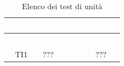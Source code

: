 {
\renewcommand{\arraystretch}{1.5}
\centering
\begin{longtable}{ c  C{8.5cm} C{3cm}}
\caption{Elenco dei test di unità}\\
\textcolor{white}{\textbf{Codice}} & \textcolor{white}{\textbf{Descrizione}} & \textcolor{white}{\textbf{Stato}}\\
\endfirsthead
{}
\textcolor{white}{\textbf{Codice}} & \textcolor{white}{\textbf{Descrizione}} & \textcolor{white}{\textbf{Stato}}\\
\endhead

TI1 & ??? & ??? \\

\end{longtable}
}